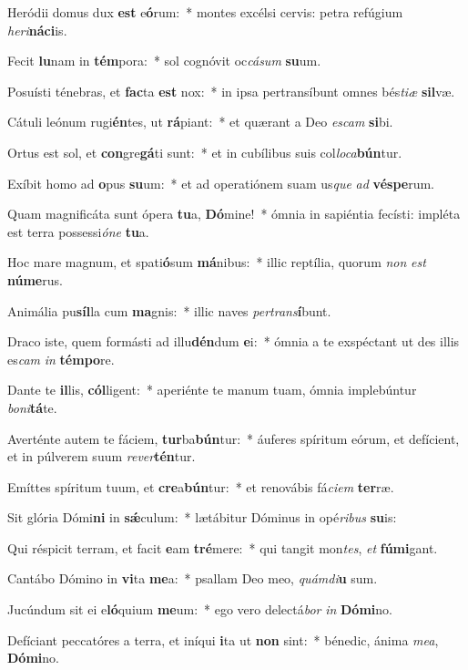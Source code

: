\item Heródii domus dux \textbf{est} e\textbf{ó}rum:~* montes excélsi cervis: petra refúgium \textit{he}\textit{ri}\textbf{ná}\textbf{ci}is.
\item Fecit \textbf{lu}nam in \textbf{tém}pora:~* sol cognóvit oc\textit{cá}\textit{sum} \textbf{su}um.
\item Posuísti ténebras, et \textbf{fac}ta \textbf{est} nox:~* in ipsa pertransíbunt omnes bés\textit{ti}\textit{æ} \textbf{sil}væ.
\item Cátuli leónum rugi\textbf{én}tes, ut \textbf{rá}piant:~* et quærant a Deo \textit{es}\textit{cam} \textbf{si}bi.
\item Ortus est sol, et \textbf{con}gre\textbf{gá}ti sunt:~* et in cubílibus suis col\textit{lo}\textit{ca}\textbf{bún}tur.
\item Exíbit homo ad \textbf{o}pus \textbf{su}um:~* et ad operatiónem suam us\textit{que} \textit{ad} \textbf{vés}\textbf{pe}rum.
\item Quam magnificáta sunt ópera \textbf{tu}a, \textbf{Dó}mine!~* ómnia in sapiéntia fecísti: impléta est terra possessi\textit{ó}\textit{ne} \textbf{tu}a.
\item Hoc mare magnum, et spati\textbf{ó}sum \textbf{má}nibus:~* illic reptília, quorum \textit{non} \textit{est} \textbf{nú}\textbf{me}rus.
\item Animália pu\textbf{síl}la cum \textbf{ma}gnis:~* illic naves \textit{per}\textit{trans}\textbf{í}bunt.
\item Draco iste, quem formásti ad illu\textbf{dén}dum \textbf{e}i:~* ómnia a te exspéctant ut des illis es\textit{cam} \textit{in} \textbf{tém}\textbf{po}re.
\item Dante te \textbf{il}lis, \textbf{cól}ligent:~* aperiénte te manum tuam, ómnia implebúntur \textit{bo}\textit{ni}\textbf{tá}te.
\item Averténte autem te fáciem, \textbf{tur}ba\textbf{bún}tur:~* áuferes spíritum eórum, et defícient, et in púlverem suum \textit{re}\textit{ver}\textbf{tén}tur.
\item Emíttes spíritum tuum, et \textbf{cre}a\textbf{bún}tur:~* et renovábis fá\textit{ci}\textit{em} \textbf{ter}ræ.
\item Sit glória Dómi\textbf{ni} in \textbf{sǽ}culum:~* lætábitur Dóminus in opé\textit{ri}\textit{bus} \textbf{su}is:
\item Qui réspicit terram, et facit \textbf{e}am \textbf{tré}mere:~* qui tangit mon\textit{tes}, \textit{et} \textbf{fú}\textbf{mi}gant.
\item Cantábo Dómino in \textbf{vi}ta \textbf{me}a:~* psallam Deo meo, \textit{quám}\textit{di}\textbf{u} sum.
\item Jucúndum sit ei e\textbf{ló}quium \textbf{me}um:~* ego vero delectá\textit{bor} \textit{in} \textbf{Dó}\textbf{mi}no.
\item Defíciant peccatóres a terra, et iníqui \textbf{i}ta ut \textbf{non} sint:~* bénedic, ánima \textit{me}\textit{a}, \textbf{Dó}\textbf{mi}no.
